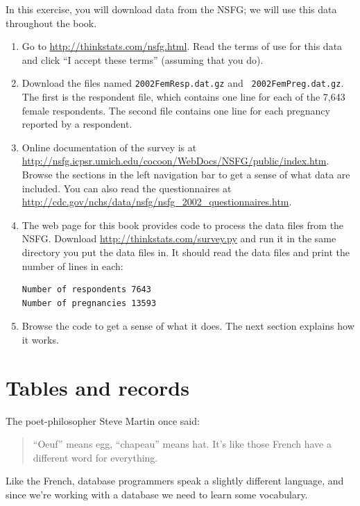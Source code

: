 \documentclass[12pt]{book}
\begin{document}
\begin{exercise}
In this exercise, you will download data from the NSFG; we will use
this data throughout the book.

\begin{enumerate}

\item Go to \url{http://thinkstats.com/nsfg.html}.  Read the terms of
use for this data and click ``I accept these terms'' (assuming that you do).

\item Download the files named {\tt 2002FemResp.dat.gz} and {\tt
  2002FemPreg.dat.gz}.  The first is the respondent file, which contains
  one line for each of the 7,643 female respondents.
  The second file contains one line for each pregnancy reported by a
  respondent.

\item Online documentation of the survey is at
  \url{http://nsfg.icpsr.umich.edu/cocoon/WebDocs/NSFG/public/index.htm}.
  Browse the sections in the left navigation bar to get a sense of
  what data are included.  You can also read the questionnaires
  at \url{http://cdc.gov/nchs/data/nsfg/nsfg_2002_questionnaires.htm}.

\item The web page for this book provides code to process the data
  files from the NSFG.  Download \url{http://thinkstats.com/survey.py}
  and run it in the same directory you put the data files in.  It
  should read the data files and print the number of lines in each:
%
\begin{verbatim}
Number of respondents 7643
Number of pregnancies 13593
\end{verbatim}

\item Browse the code to get a sense of what it does.  The next
section explains how it works.

\end{enumerate}

\end{exercise}

\section{Tables and records}

The poet-philosopher Steve Martin once said:
%
\begin{quote}
``Oeuf'' means egg, ``chapeau'' means hat.  It's like those French
  have a different word for everything.
\end{quote}
%
Like the French, database programmers speak a slightly
different language, and since we're working with a database we need
to learn some vocabulary.
\end{document}
